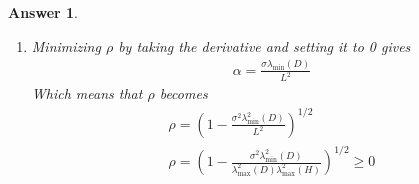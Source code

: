 \documentclass[12pt]{article}
\theoremstyle{colon}
\newtheorem*{answer}{Answer}
\begin{document}
\begin{answer}
\begin{enumerate}[label=\arabic*)]
      \begin{gather*}
        \lVert x^{k+1} - x^* \rVert_{D^{-1}}^2 = \lVert y^{k+1} - y^* \rVert^2 \\
        \leq \lVert y^k - \alpha \nabla g(y^k) - y^* + \alpha \nabla g(y^*) \rVert^2 \\
        \leq \lVert y^k - y^* \rVert^2 + 2 \alpha (y^k - y^*)^T (\nabla g(y^*) - \nabla g(y^k)) + \alpha^2 \lVert \nabla g(y^*) - \nabla g(y^k) \rVert^2 \\
        \leq (1 - 2 \alpha \sigma \lambda_{\text{min}}(D) + L^2 \alpha^2) \lVert y^* - y^k \rVert^2
      \end{gather*}
      Where the last line is a result of the following two inequalities. By strong convexity, we have
      \begin{gather*}
        \nabla^2 g = S \nabla^2 f S \succeq \sigma D \succeq \sigma \lambda_{\text{min}}(D) I \\
        \implies (y^k - y^*)^T (\nabla g(y^*) - \nabla g(y^k)) \leq -\sigma \lambda_{\text{min}}(D) \lVert y^k - y^* \rVert^2
      \end{gather*}
      By $L$-Lipschitz
      \begin{gather*}
        \lVert \nabla g(y^*) - \nabla g(y^k) \rVert^2 \leq L \lVert y^k - y^* \rVert^2
      \end{gather*}
      Where $L = \lambda_{\text{max}}(D)\lambda_{\text{max}}(H)$ as before. Applying the bound recursively yields,
      \begin{gather*}
        \lVert x^k - x^* \rVert_{D^{-1}}^2 \leq (1 - 2 \alpha \sigma \lambda_{\text{min}}(D) + L^2 \alpha^2)^k \lVert x^0 - x^* \rVert_{D^{-1}}^2
      \end{gather*}
      Thus, letting $\rho = (1 - 2 \alpha \sigma \lambda_{\text{min}}(D) + L^2 \alpha^2)^{1/2}$ gives us
      \begin{gather*}
        \lVert x^k - x^* \rVert_{D^{-1}} \leq \rho^k \lVert x^0 - x^* \rVert_{D^{-1}}
      \end{gather*}
    \item Minimizing $\rho$ by taking the derivative and setting it to 0 gives
      \begin{gather*}
        \alpha  = \frac{\sigma \lambda_{\text{min}}(D)}{L^2}
      \end{gather*}
      Which means that $\rho$ becomes
      \begin{gather*}
        \rho = \left( 1 - \frac{\sigma^2 \lambda_{\text{min}}^2 (D)}{L^2} \right)^{1/2} \\
        \rho = \left( 1 - \frac{\sigma^2 \lambda_{\text{min}}^2 (D)}{\lambda_{\text{max}}^2(D)\lambda_{\text{max}}^2(H)} \right)^{1/2} \geq 0
      \end{gather*}
  \end{enumerate}
\end{answer}
\end{document}
